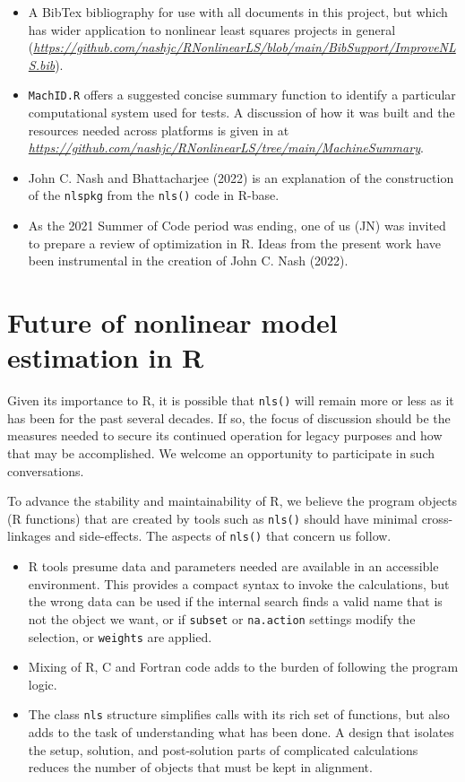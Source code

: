 \begin{itemize}
\item
  A BibTex bibliography for use with all documents in this project, but which
  has wider application to nonlinear least squares projects in general
  (\emph{\url{https://github.com/nashjc/RNonlinearLS/blob/main/BibSupport/ImproveNLS.bib}}).
\item
  \texttt{MachID.R} offers a suggested concise summary function
  to identify a particular computational system used for tests. A discussion
  of how it was built and the resources needed across platforms is given in
  at \emph{\url{https://github.com/nashjc/RNonlinearLS/tree/main/MachineSummary}}.
\item
  John C. Nash and Bhattacharjee (2022) is an explanation of the construction of the \texttt{nlspkg} from the
  \texttt{nls()} code in R-base.
\item
  As the 2021 Summer of Code period was ending, one of us (JN) was invited to prepare
  a review of optimization in R. Ideas from the present work have been instrumental
  in the creation of John C. Nash (2022).
\end{itemize}

\hypertarget{future-of-nonlinear-model-estimation-in-r}{%
\section{Future of nonlinear model estimation in R}\label{future-of-nonlinear-model-estimation-in-r}}

Given its importance to R, it is possible that \texttt{nls()} will remain more or less
as it has been for the past several decades. If so, the focus of discussion
should be the measures needed to secure its continued operation for legacy
purposes and how that may be accomplished.
We welcome an opportunity to participate in such conversations.

To advance the stability and maintainability of R, we believe the program
objects (R functions)
that are created by tools such as \texttt{nls()} should have minimal
cross-linkages and side-effects.
The aspects of \texttt{nls()} that concern us follow.

\begin{itemize}
\item
  R tools presume data and parameters needed are available in an
  accessible environment. This provides a compact syntax to invoke the
  calculations, but the wrong data can be used if the
  internal search finds a valid name that is not the object we want,
  or if \texttt{subset} or \texttt{na.action} settings modify the selection, or
  \texttt{weights} are applied.
\item
  Mixing of R, C and Fortran code adds to the burden of following the
  program logic.
\item
  The class \texttt{nls} structure simplifies calls with its rich set of functions, but
  also adds to the task of understanding what has been done. A design that isolates
  the setup, solution, and post-solution parts of complicated calculations reduces
  the number of objects that must be kept in alignment.
\end{itemize}

